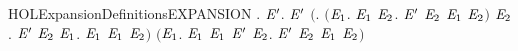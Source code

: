 \begin{SaveVerbatim}{HOLExpansionDefinitionsEXPANSION}
\HOLTokenTurnstile{} \HOLSymConst{\HOLTokenForall{}}.
         \HOLSymConst{\HOLTokenEquiv{}}
       \HOLSymConst{\HOLTokenForall{}} \ensuremath{\HOLBoundVar{E}\sp{\prime}}.
             \ensuremath{\HOLBoundVar{E}\sp{\prime}} \HOLSymConst{\HOLTokenImp{}}
           \ensuremath{(}\HOLSymConst{\HOLTokenForall{}}.
                \ensuremath{(}\HOLSymConst{\HOLTokenForall{}}\ensuremath{\HOLBoundVar{E}\sb{\mathrm{1}}}.
                      \HOLTokenTransBegin{} \HOLTokenTransEnd \ensuremath{\HOLBoundVar{E}\sb{\mathrm{1}}} \HOLSymConst{\HOLTokenImp{}}
                     \HOLSymConst{\HOLTokenExists{}}\ensuremath{\HOLBoundVar{E}\sb{\mathrm{2}}}. \ensuremath{\HOLBoundVar{E}\sp{\prime}} \HOLTokenTransBegin{} \HOLTokenTransEnd \ensuremath{\HOLBoundVar{E}\sb{\mathrm{2}}} \HOLSymConst{\HOLTokenConj{}}  \ensuremath{\HOLBoundVar{E}\sb{\mathrm{1}}} \ensuremath{\HOLBoundVar{E}\sb{\mathrm{2}}}\ensuremath{)} \HOLSymConst{\HOLTokenConj{}}
                \HOLSymConst{\HOLTokenForall{}}\ensuremath{\HOLBoundVar{E}\sb{\mathrm{2}}}.
                    \ensuremath{\HOLBoundVar{E}\sp{\prime}} \HOLTokenTransBegin{} \HOLTokenTransEnd \ensuremath{\HOLBoundVar{E}\sb{\mathrm{2}}} \HOLSymConst{\HOLTokenImp{}}
                    \HOLSymConst{\HOLTokenExists{}}\ensuremath{\HOLBoundVar{E}\sb{\mathrm{1}}}.  \HOLTokenWeakTransBegin{} \HOLTokenWeakTransEnd \ensuremath{\HOLBoundVar{E}\sb{\mathrm{1}}} \HOLSymConst{\HOLTokenConj{}}  \ensuremath{\HOLBoundVar{E}\sb{\mathrm{1}}} \ensuremath{\HOLBoundVar{E}\sb{\mathrm{2}}}\ensuremath{)} \HOLSymConst{\HOLTokenConj{}}
           \ensuremath{(}\HOLSymConst{\HOLTokenForall{}}\ensuremath{\HOLBoundVar{E}\sb{\mathrm{1}}}.
                 \HOLTokenTransBegin\HOLConst{\ensuremath{\tau}}\HOLTokenTransEnd \ensuremath{\HOLBoundVar{E}\sb{\mathrm{1}}} \HOLSymConst{\HOLTokenImp{}}
                 \ensuremath{\HOLBoundVar{E}\sb{\mathrm{1}}} \ensuremath{\HOLBoundVar{E}\sp{\prime}} \HOLSymConst{\HOLTokenDisj{}} \HOLSymConst{\HOLTokenExists{}}\ensuremath{\HOLBoundVar{E}\sb{\mathrm{2}}}. \ensuremath{\HOLBoundVar{E}\sp{\prime}} \HOLTokenTransBegin\HOLConst{\ensuremath{\tau}}\HOLTokenTransEnd \ensuremath{\HOLBoundVar{E}\sb{\mathrm{2}}} \HOLSymConst{\HOLTokenConj{}}  \ensuremath{\HOLBoundVar{E}\sb{\mathrm{1}}} \ensuremath{\HOLBoundVar{E}\sb{\mathrm{2}}}\ensuremath{)} \HOLSymConst{\HOLTokenConj{}}

\end{SaveVerbatim}
